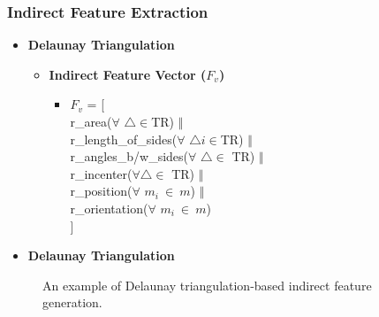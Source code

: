 \subsubsection{Indirect Feature Extraction}
\begin{frame}[t]{\subsubsecname}
	\topline
    \begin{itemize}
    	\item \textcolor{navy_theme}{\textbf{Delaunay Triangulation \cite{lee1980two}}}
		\vspace{1em}
    	\begin{itemize}
			\setlength\itemsep{1em}
			\item \textbf{ Indirect Feature Vector ($F_v$)}
			\vspace{0.75em}
			\begin{itemize}
				\setlength\itemsep{0.75em}
				\item $F_{v}$ = [\\\hspace{1em}
				r\_area($\forall$ $\triangle \in$TR) $\mathbin\Vert$ \\\hspace{1em}
				r\_length\_of\_sides($\forall$ $\triangle{i} \in$TR) $\mathbin\Vert$ \\\hspace{1em}
				r\_angles\_b/w\_sides($\forall$ $\triangle \in$ TR) $\mathbin\Vert$ \\\hspace{1em}
				r\_incenter($\forall \triangle \in$ TR) $\mathbin\Vert$ \\\hspace{1em}
				r\_position($\forall$ $m_{i}~\in~ m$) $\mathbin\Vert$\\\hspace{1em}
				r\_orientation($\forall$ $m_{i}~ \in ~m$)\\
				]
			\end{itemize}
		\end{itemize}
	\end{itemize}
\end{frame}
\begin{frame}[t]{\subsubsecname}
	\topline
    \begin{itemize}
    	\item \textcolor{navy_theme}{\textbf{Delaunay Triangulation \cite{lee1980two}}}
    	
	\end{itemize}
	\begin{figure}[!ht]
    		\centering
    		 
    		\caption{An example of Delaunay triangulation-based indirect feature generation.}
    		\label{fig:relative}
    		\vspace{-6mm}
    	\end{figure}
\end{frame}


